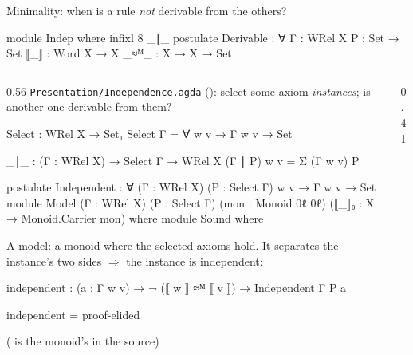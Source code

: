 \begin{frame}{Minimality: when is a rule \emph{not} derivable from the others? \New}
\begin{code}[hide]
module Indep where
  infixl 8 _∣_
  postulate
    Derivable : ∀ {Γ : WRel X} {P : Set} → Set
    ⟦_⟧ : Word X → X
    _≈ᴹ_ : X → X → Set
\end{code}
\begin{columns}[c]
\begin{column}{0.56\textwidth}
\small \texttt{Presentation/Independence.agda} (): select some
axiom \emph{instances}; is another one derivable from them?
\begin{code}
  Select : WRel X → Set₁
  Select Γ = ∀ {w v} → Γ w v → Set

  _∣_ : (Γ : WRel X) → Select Γ → WRel X
  (Γ ∣ P) w v = Σ (Γ w v) P
\end{code}
\begin{code}[hide]
  postulate
    Independent : ∀ (Γ : WRel X) (P : Select Γ) {w v} → Γ w v → Set
  module Model (Γ : WRel X) (P : Select Γ) (mon : Monoid 0ℓ 0ℓ) (⟦_⟧₀ : X → Monoid.Carrier mon) where
   module Sound where
\end{code}
\par\medskip
\small A \alert{model}: a monoid where the selected axioms hold. It
separates the instance's two sides $\Rightarrow$ the instance is independent:
\begin{code}
    independent : (a : Γ w v) → ¬ (⟦ w ⟧ ≈ᴹ ⟦ v ⟧) → Independent Γ P a
\end{code}
\begin{code}[hide]
    independent = proof-elided
\end{code}
{\scriptsize ( is the monoid's  in the source)}
\end{column}
\begin{column}{0.41\textwidth}
\centering
{}


\end{column}
\end{columns}
\end{frame}
